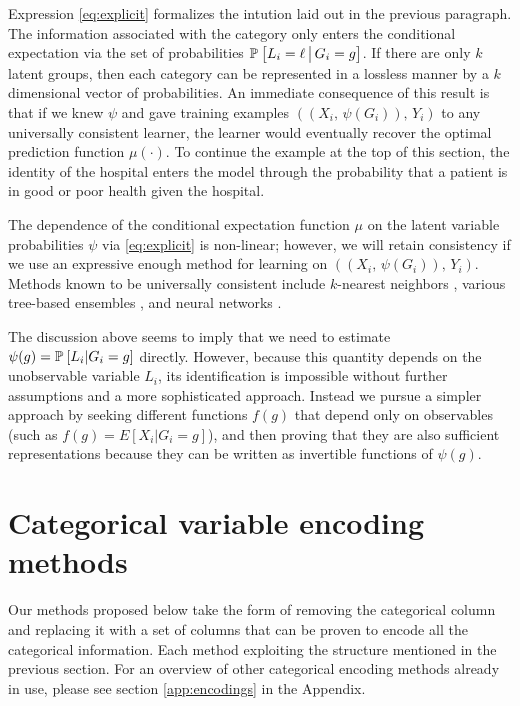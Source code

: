 \documentclass{article}
\theoremstyle{plain}
\theoremstyle{definition}
\theoremstyle{remark}
\begin{document}
Expression \eqref{eq:explicit} formalizes the intution laid out in the previous paragraph. The information associated with the category only enters the conditional expectation via the set of probabilities $\mathbb{P}_{}\left[L_{i} = \ell \,\big|\, G_{i} = g\right]$. If there are only $k$ latent groups, then each category can be represented in a lossless manner by a $k$ dimensional vector of probabilities. An immediate consequence of this result is that if we knew $\psi$ and gave training examples $((X_i, \, \psi(G_i)), \, Y_i)$ to any universally consistent learner, the learner would eventually recover the optimal prediction function $\mu(\cdot)$. To continue the example at the top of this section, the identity of the hospital enters the model through the probability that a patient is in good or poor health given the hospital.

The dependence of the conditional expectation function $\mu$ on the latent variable probabilities $\psi$ via \eqref{eq:explicit} is non-linear; however, we will retain consistency if we use an expressive enough method for learning on $((X_i, \, \psi(G_i)), \, Y_i)$. Methods known to be universally consistent include $k$-nearest neighbors \citep{stone1977consistent}, various tree-based ensembles \citep{biau2008consistency}, and neural networks \citep{farago1993strong}.

The discussion above seems to imply that we need to estimate $\psi(g) = \mathbb{P}_{}\left[ L_{i} | G_{i} = g\right]$ directly. However, because this quantity depends on the unobservable variable $L_{i}$, its identification is impossible without further assumptions and a more sophisticated approach. Instead we pursue a simpler approach by seeking different functions $f(g)$ that depend only on observables (such as $f(g) = E[X_{i} | G_{i} = g]$), and then proving that they are also sufficient representations because they can be written as invertible functions of $\psi(g)$.


\section{Categorical variable encoding methods}
\label{sec:categorical_encoding}

Our methods proposed below take the form of removing the categorical column and replacing it with a set of columns that can be proven to encode all the categorical information. Each method exploiting the structure mentioned in the previous section. For an overview of other categorical encoding methods already in use, please see section \ref{app:encodings} in the Appendix.
\end{document}
